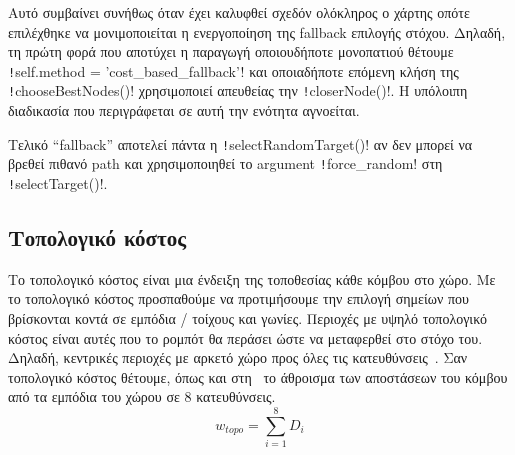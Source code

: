 \begin{itemize}
          Αυτό συμβαίνει συνήθως όταν έχει καλυφθεί σχεδόν ολόκληρος ο χάρτης οπότε επιλέχθηκε να μονιμοποιείται η ενεργοποίηση της fallback επιλογής στόχου.
          Δηλαδή, τη πρώτη φορά που αποτύχει η παραγωγή οποιουδήποτε μονοπατιού θέτουμε
          \texttt!self.method = 'cost_based_fallback'!
          και οποιαδήποτε επόμενη κλήση της \texttt!chooseBestNodes()! χρησιμοποιεί απευθείας την \texttt!closerNode()!.
          Η υπόλοιπη διαδικασία που περιγράφεται σε αυτή την ενότητα αγνοείται.

          Τελικό ``fallback'' αποτελεί πάντα η \texttt!selectRandomTarget()! αν δεν μπορεί να βρεθεί πιθανό path και χρησιμοποιηθεί το argument \texttt!force_random! στη \texttt!selectTarget()!.
\end{itemize}

\subsection{Τοπολογικό κόστος}\label{section:topo-cost}
Το τοπολογικό κόστος είναι μια ένδειξη της τοποθεσίας κάθε κόμβου στο χώρο.
Με το τοπολογικό κόστος προσπαθούμε να προτιμήσουμε την επιλογή σημείων που βρίσκονται κοντά σε εμπόδια / τοίχους και γωνίες.
Περιοχές με υψηλό τοπολογικό κόστος είναι αυτές που το ρομπότ θα περάσει ώστε να μεταφερθεί στο στόχο του.
Δηλαδή, κεντρικές περιοχές με αρκετό χώρο προς όλες τις κατευθύνσεις~\cite{etsardou-phd}.
Σαν τοπολογικό κόστος θέτουμε, όπως και στη~\cite{etsardou-phd,tsardoulias2016cost} το άθροισμα των αποστάσεων του κόμβου από τα εμπόδια του χώρου σε 8 κατευθύνσεις.
\begin{equation}
    w_{topo} = \sum_{i=1}^{8} D_i
\end{equation}


